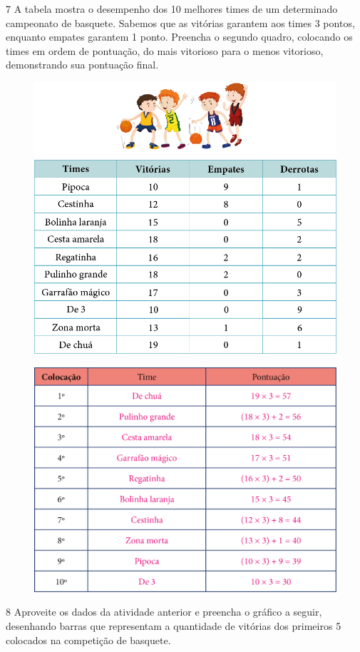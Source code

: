 \pagebreak

\num{7} A tabela mostra o desempenho dos 10 melhores times de um
determinado campeonato de basquete. Sabemos que as vitórias garantem aos
times 3 pontos, enquanto empates garantem 1 ponto. Preencha o segundo quadro,
colocando os times em ordem de pontuação, do mais vitorioso para o menos
vitorioso, demonstrando sua pontuação final.


\begin{figure}[htpb!]
\centering
\includegraphics[width=.65\textwidth]{./media/image94.png}
\end{figure}

\begin{figure}[htpb!]
\centering
\includegraphics[width=.7\textwidth]{./media/image95.png}
\end{figure}

\pagebreak
\num{8} Aproveite os dados da atividade anterior e preencha o gráfico a seguir,
desenhando barras que representam a quantidade de vitórias dos primeiros
5 colocados na competição de basquete.

